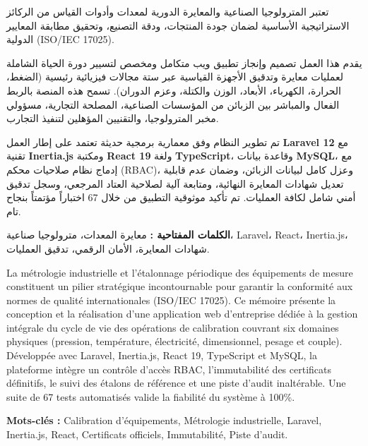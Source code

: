 \documentclass{bts-report-ar}
\begin{document}
\begin{abstractar}
تعتبر المترولوجيا الصناعية والمعايرة الدورية لمعدات وأدوات القياس من الركائز الاستراتيجية الأساسية لضمان جودة المنتجات، ودقة التصنيع، وتحقيق مطابقة المعايير الدولية (ISO/IEC 17025). 

يقدم هذا العمل تصميم وإنجاز تطبيق ويب متكامل ومخصص لتسيير دورة الحياة الشاملة لعمليات معايرة وتدقيق الأجهزة القياسية عبر ستة مجالات فيزيائية رئيسية (الضغط، الحرارة، الكهرباء، الأبعاد، الوزن والكتلة، وعزم الدوران). تسمح هذه المنصة بالربط الفعال والمباشر بين الزبائن من المؤسسات الصناعية، المصلحة التجارية، مسؤولي مخبر المترولوجيا، والتقنيين المؤهلين لتنفيذ التجارب. 

تم تطوير النظام وفق معمارية برمجية حديثة تعتمد على إطار العمل \textbf{Laravel 12} مع تقنية \textbf{Inertia.js} ومكتبة \textbf{React 19} ولغة \textbf{TypeScript}، وقاعدة بيانات \textbf{MySQL}، مع إدماج نظام صلاحيات محكم (RBAC)، وعزل كامل لبيانات الزبائن، وضمان عدم قابلية تعديل شهادات المعايرة النهائية، ومتابعة آلية لصلاحية العتاد المرجعي، وسجل تدقيق أمني شامل لكافة العمليات. تم تأكيد موثوقية التطبيق من خلال 67 اختباراً مؤتمتاً بنجاح تام.

\vspace{0.6cm}
\noindent\textbf{الكلمات المفتاحية :} معايرة المعدات، مترولوجيا صناعية، Laravel، React، Inertia.js، شهادات المعايرة، الأمان الرقمي، تدقيق العمليات.
\end{abstractar}

\begin{abstractfr}
La m\'etrologie industrielle et l'\'etalonnage p\'eriodique des \'equipements de mesure constituent un pilier strat\'egique incontournable pour garantir la conformit\'e aux normes de qualit\'e internationales (ISO/IEC 17025). Ce m\'emoire pr\'esente la conception et la r\'ealisation d'une application web d'entreprise d\'edi\'ee \`a la gestion int\'egrale du cycle de vie des op\'erations de calibration couvrant six domaines physiques (pression, temp\'erature, \'electricit\'e, dimensionnel, pesage et couple). D\'evelopp\'ee avec Laravel, Inertia.js, React 19, TypeScript et MySQL, la plateforme int\`egre un contr\^ole d'acc\`es RBAC, l'immutabilit\'e des certificats d\'efinitifs, le suivi des \'etalons de r\'ef\'erence et une piste d'audit inalt\'erable. Une suite de 67 tests automatis\'es valide la fiabilit\'e du syst\`eme \`a 100\%.

\vspace{0.6cm}
\noindent\textbf{Mots-cl\'es :} Calibration d'\'equipements, M\'etrologie industrielle, Laravel, Inertia.js, React, Certificats officiels, Immutabilit\'e, Piste d'audit.
\end{abstractfr}
\end{document}
